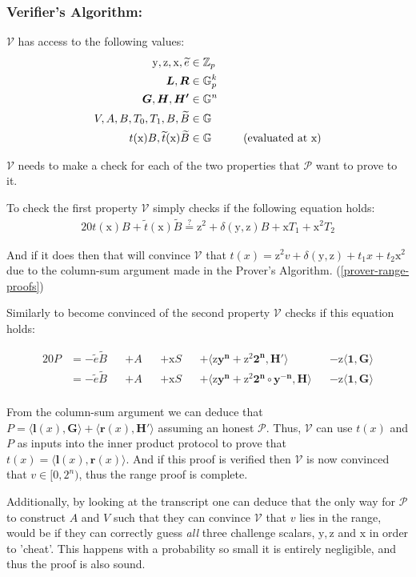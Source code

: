 \documentclass{article}
\newcommand{\eq}[1]{\begin{alignat*}{20}#1\end{alignat*}}
\newcommand{\eqn}[2]{\begin{equation}\label{#1}\begin{split}#2\end{split}\end{equation}}
\renewcommand{\vec}[1]{\boldsymbol{#1}}
\newcommand{\ran}[1]{\mathrm{#1}}
\newcommand{\vecran}[1]{\mathbf{#1}}
\newcommand{\V}{\mathcal{V}}
\renewcommand{\P}{\mathcal{P}}
\newcommand{\G}{\mathbb{G}}
\newcommand{\Z}{\mathbb{Z}}
\newcommand{\dotp}[2]{\langle #1, #2 \rangle}
\newcommand{\blind}[1]{\widetilde{#1}}
\newcommand{\bt}{\blind{t}}
\newcommand{\bB}{\blind{B}}
\newcommand{\be}{\blind{e}}
\begin{document}
\subsubsection{Verifier's Algorithm:} \label{verifier-range-proof}

$\V$ has access to the following values:
\eqn{range-def1-ver}{
	\ran{y}, \ran{z}, \ran{x}, \be &\in \Z_p \\
	\vec{L}, \vec{R} &\in \G_p^{k} \\
	\vec{G}, \vec{H}, \vec{H'} &\in \G^n \\
	V, A, B, T_0, T_1, B, \bB &\in \G \\
	t(\ran{x})B, \bt(\ran{x})\bB &\in \G \hspace*{1cm} \text{(evaluated at x)}
}

$\V$ needs to make a check for each of the two properties that $\P$ want to
prove to it.

To check the first property $\V$ simply checks if the following
equation holds:
\eq{
	t(\ran{x})B + \bt(\ran{x})\bB \stackrel{?}{=} \ran{z^2} + \delta(\ran{y},\ran{z})B + \ran{x}T_1 + \ran{x^2}T_2
}

And if it does then that will convince $\V$ that $t(x) = \ran{z^2}v +
\delta(\ran{y},\ran{z}) + t_1x + t_2\ran{x^2}$ due to the column-sum
argument made in the Prover's Algorithm. (\ref{prover-range-proofs})

Similarly to become convinced of the second property $\V$ checks if
this equation holds:

\eq{
	P &= -\be\bB &&+ A &&+ \ran{x}S &&+ \dotp{\ran{z}\vecran{y}^{\vecran{n}} + \ran{z^2}\vec{2^n}}{\vec{H'}} &&- \ran{z}\dotp{\vec{1}}{\vec{\vec{G}}} \\
	&= -\be\bB &&+ A &&+ \ran{x}S &&+ \dotp{\ran{z}\vecran{y}^{\vecran{n}} + \ran{z^2}\vec{2^n}\circ\vecran{y^{-n}}}{\vec{H}} &&- \ran{z}\dotp{\vec{1}}{\vec{G}} \\
}

From the column-sum argument we can deduce that $P =
\dotp{\vec{l}(x)}{\vec{G}} + \dotp{\vec{r}(x)}{\vec{H'}}$
assuming an honest $\P$. Thus, $\V$ can use $t(x)$ and $P$ as
inputs into the inner product protocol to prove that $ t(x) =
\dotp{\vec{l}(x)}{\vec{r}(x)}$. And if this proof is verified then
$\V$ is now convinced that $v\in [0,2^n)$, thus the range proof is 
complete.

Additionally, by looking at the transcript one can deduce that the
only way for $\P$ to construct $A$ and $V$ such that they can convince
$\V$ that $v$ lies in the range, would be if they can correctly guess
\textit{all} three challenge scalars, $\ran{y}, \ran{z}$ and $\ran{x}$
in order to 'cheat'. This happens with a probability so small it is
entirely negligible, and thus the proof is also sound.
\end{document}
